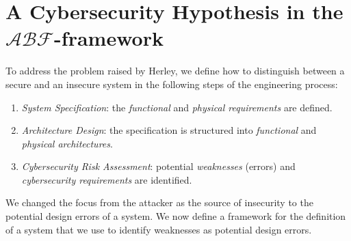 \documentclass[runningheads]{llncs}
\newcommand{\assertionRegion}{\mathcal{A}}
\newcommand{\beliefRegion}{\mathcal{B}}
\newcommand{\factRegion}{\mathcal{F}}
\newcommand{\abftheory}{\assertionRegion\beliefRegion\factRegion}
\begin{document}
\section{A Cybersecurity Hypothesis in the $\abftheory$-framework}\label{sec:hypothesis}
To address the problem raised by Herley, we define how to
distinguish between a secure and an insecure system in the following steps 
of the engineering process:
\begin{enumerate}
  \item \emph{System Specification}: the \emph{functional} and \emph{physical requirements} are defined.
  \item \emph{Architecture Design}: the specification is structured into \emph{functional} and \emph{physical architectures}.
	\item \emph{Cybersecurity Risk Assessment}: potential \emph{weaknesses} (errors) and
		\emph{cybersecurity requirements} are identified.	
\end{enumerate}
We changed the focus from the attacker as the source of insecurity to the
potential design errors of a system. We now define a framework for the
definition of a system that we use to identify weaknesses as potential design
errors.
\end{document}
